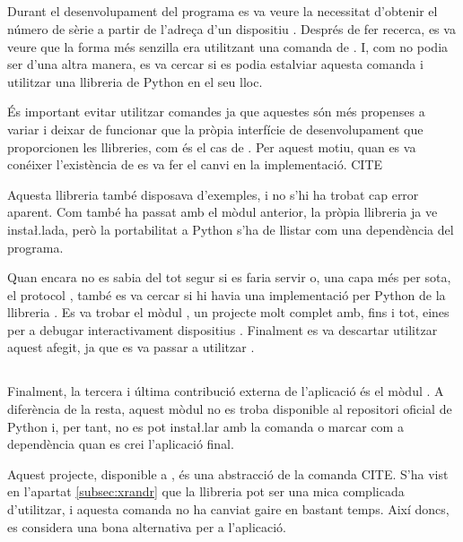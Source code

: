 \subsection{}

Durant el desenvolupament del programa es va veure la necessitat d'obtenir el
número de sèrie a partir de l'adreça d'un dispositiu . Després de fer
recerca, es va veure que la forma més senzilla era utilitzant una comanda
de . I, com no podia ser d'una altra manera, es va cercar si es podia
estalviar aquesta comanda i utilitzar una llibreria de Python en el seu lloc.

És important evitar utilitzar comandes ja que aquestes són més propenses a
variar i deixar de funcionar que la pròpia interfície de desenvolupament que
proporcionen les llibreries, com és el cas de . Per aquest motiu,
quan es va conéixer l'existència de  es va fer el canvi en la
implementació. CITE

Aquesta llibreria també disposava d'exemples, i no s'hi ha trobat cap
error aparent. Com també ha passat amb el mòdul anterior, la pròpia llibreria
ja ve insta\l.lada, però la portabilitat a Python s'ha de llistar com una
dependència del programa.

Quan encara no es sabia del tot segur si es faria servir  o, una capa
més per sota, el protocol , també es va cercar si hi havia una
implementació per Python de la llibreria . Es va trobar el mòdul
, un projecte molt complet amb, fins i tot, eines per a debugar
interactivament dispositius . Finalment es va descartar utilitzar
aquest afegit, ja que es va passar a utilitzar .

\subsection{}

Finalment, la tercera i última contribució externa de l'aplicació és el
mòdul . A diferència de la resta, aquest mòdul no es troba
disponible al repositori oficial de Python  i, per tant, no es pot
insta\l.lar amb la comanda  o marcar com a dependència quan es crei
l'aplicació final.

Aquest projecte, disponible a , és una abstracció de la comanda
 CITE. S'ha vist en l'apartat \ref{subsec:xrandr} que la llibreria
 pot ser una mica complicada d'utilitzar, i aquesta comanda no ha
canviat gaire en bastant temps. Així doncs, es considera una bona alternativa
per a l'aplicació.

